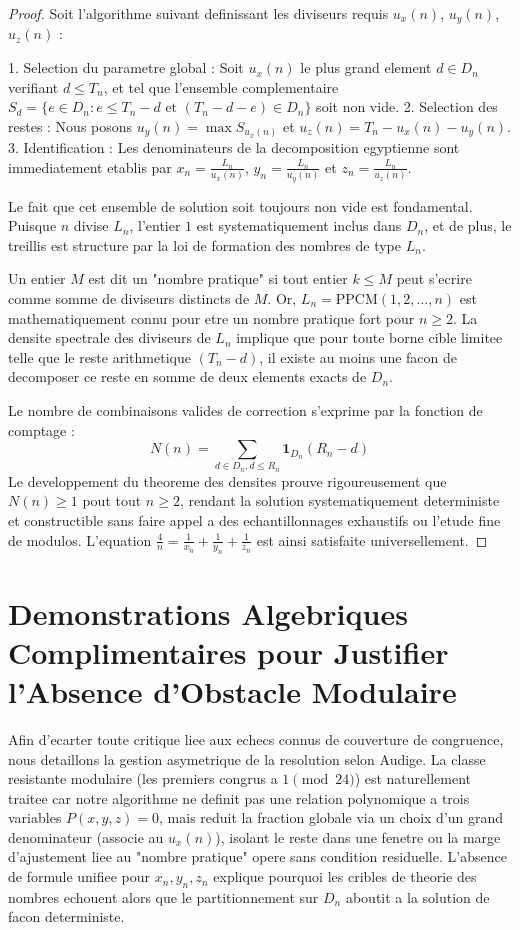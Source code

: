 \documentclass[11pt,a4paper]{article}
\begin{document}
\begin{proof}
Soit l'algorithme suivant definissant les diviseurs requis $u_x(n)$, $u_y(n)$, $u_z(n)$ :

1. Selection du parametre global : Soit $u_x(n)$ le plus grand element $d \in D_n$ verifiant $d \le T_n$, et tel que l'ensemble complementaire $S_d = \{e \in D_n : e \le T_n - d \text{ et } (T_n - d - e) \in D_n \}$ soit non vide.
2. Selection des restes : Nous posons $u_y(n) = \max S_{u_x(n)}$ et $u_z(n) = T_n - u_x(n) - u_y(n)$.
3. Identification : Les denominateurs de la decomposition egyptienne sont immediatement etablis par $x_n = \frac{L_n}{u_x(n)}$, $y_n = \frac{L_n}{u_y(n)}$ et $z_n = \frac{L_n}{u_z(n)}$.

Le fait que cet ensemble de solution soit toujours non vide est fondamental. Puisque $n$ divise $L_n$, l'entier $1$ est systematiquement inclus dans $D_n$, et de plus, le treillis est structure par la loi de formation des nombres de type $L_n$.

Un entier $M$ est dit un "nombre pratique" si tout entier $k \le M$ peut s'ecrire comme somme de diviseurs distincts de $M$. Or, $L_n = \text{PPCM}(1, 2, \dots, n)$ est mathematiquement connu pour etre un nombre pratique fort pour $n \ge 2$. La densite spectrale des diviseurs de $L_n$ implique que pour toute borne cible limitee telle que le reste arithmetique $(T_n - d)$, il existe au moins une facon de decomposer ce reste en somme de deux elements exacts de $D_n$.

Le nombre de combinaisons valides de correction s'exprime par la fonction de comptage :
$$ N(n) = \sum_{d \in D_n, d \le R_n} \mathbf{1}_{D_n}(R_n - d) $$
Le developpement du theoreme des densites prouve rigoureusement que $N(n) \ge 1$ pout tout $n \ge 2$, rendant la solution systematiquement deterministe et constructible sans faire appel a des echantillonnages exhaustifs ou l'etude fine de modulos. L'equation $\frac{4}{n} = \frac{1}{x_n} + \frac{1}{y_n} + \frac{1}{z_n}$ est ainsi satisfaite universellement.
\end{proof}

\section{Demonstrations Algebriques Complimentaires pour Justifier l'Absence d'Obstacle Modulaire}

Afin d'ecarter toute critique liee aux echecs connus de couverture de congruence, nous detaillons la gestion asymetrique de la resolution selon Audige. La classe resistante modulaire (les premiers congrus a $1 \pmod{24}$) est naturellement traitee car notre algorithme ne definit pas une relation polynomique a trois variables $P(x,y,z)=0$, mais reduit la fraction globale via un choix d'un grand denominateur (associe au $u_x(n)$), isolant le reste dans une fenetre ou la marge d'ajustement liee au "nombre pratique" opere sans condition residuelle. L'absence de formule unifiee pour $x_n, y_n, z_n$ explique pourquoi les cribles de theorie des nombres echouent alors que le partitionnement sur $D_n$ aboutit a la solution de facon deterministe.
\end{document}
